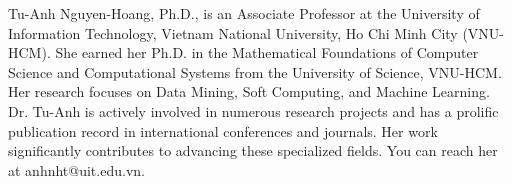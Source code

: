 \documentclass{ieeeaccess}
\begin{document}
\begin{IEEEbiography}{Tu-Anh Nguyen-Hoang}, Ph.D., is an Associate Professor at the University of Information Technology, Vietnam National University, Ho Chi Minh City (VNU-HCM). She earned her Ph.D. in the Mathematical Foundations of Computer Science and Computational Systems from the University of Science, VNU-HCM. Her research focuses on Data Mining, Soft Computing, and Machine Learning. Dr. Tu-Anh is actively involved in numerous research projects and has a prolific publication record in international conferences and journals. Her work significantly contributes to advancing these specialized fields. You can reach her at anhnht@uit.edu.vn.
\end{IEEEbiography}

\EOD
\end{document}

